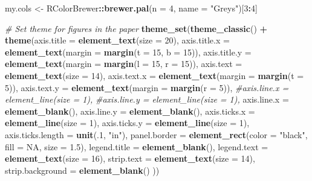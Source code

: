 \documentclass[]{article}
\newenvironment{Shaded}{\begin{snugshade}}{\end{snugshade}}
\newcommand{\KeywordTok}[1]{\textcolor[rgb]{0.13,0.29,0.53}{\textbf{#1}}}
\newcommand{\DataTypeTok}[1]{\textcolor[rgb]{0.13,0.29,0.53}{#1}}
\newcommand{\DecValTok}[1]{\textcolor[rgb]{0.00,0.00,0.81}{#1}}
\newcommand{\FloatTok}[1]{\textcolor[rgb]{0.00,0.00,0.81}{#1}}
\newcommand{\StringTok}[1]{\textcolor[rgb]{0.31,0.60,0.02}{#1}}
\newcommand{\CommentTok}[1]{\textcolor[rgb]{0.56,0.35,0.01}{\textit{#1}}}
\newcommand{\OtherTok}[1]{\textcolor[rgb]{0.56,0.35,0.01}{#1}}
\newcommand{\OperatorTok}[1]{\textcolor[rgb]{0.81,0.36,0.00}{\textbf{#1}}}
\newcommand{\NormalTok}[1]{#1}
\begin{document}
\begin{Shaded}
\begin{Highlighting}[]
\NormalTok{my.cols <-}\StringTok{ }\NormalTok{RColorBrewer}\OperatorTok{::}\KeywordTok{brewer.pal}\NormalTok{(}\DataTypeTok{n =} \DecValTok{4}\NormalTok{, }\DataTypeTok{name =} \StringTok{"Greys"}\NormalTok{)[}\DecValTok{3}\OperatorTok{:}\DecValTok{4}\NormalTok{]}

\CommentTok{# Set theme for figures in the paper}
\KeywordTok{theme_set}\NormalTok{(}\KeywordTok{theme_classic}\NormalTok{() }\OperatorTok{+}\StringTok{ }
\StringTok{  }\KeywordTok{theme}\NormalTok{(}\DataTypeTok{axis.title =} \KeywordTok{element_text}\NormalTok{(}\DataTypeTok{size =} \DecValTok{20}\NormalTok{),}
        \DataTypeTok{axis.title.x =} \KeywordTok{element_text}\NormalTok{(}\DataTypeTok{margin =} \KeywordTok{margin}\NormalTok{(}\DataTypeTok{t =} \DecValTok{15}\NormalTok{, }\DataTypeTok{b =} \DecValTok{15}\NormalTok{)),}
        \DataTypeTok{axis.title.y =} \KeywordTok{element_text}\NormalTok{(}\DataTypeTok{margin =} \KeywordTok{margin}\NormalTok{(}\DataTypeTok{l =} \DecValTok{15}\NormalTok{, }\DataTypeTok{r =} \DecValTok{15}\NormalTok{)),}
        \DataTypeTok{axis.text =} \KeywordTok{element_text}\NormalTok{(}\DataTypeTok{size =} \DecValTok{14}\NormalTok{),}
        \DataTypeTok{axis.text.x =} \KeywordTok{element_text}\NormalTok{(}\DataTypeTok{margin =} \KeywordTok{margin}\NormalTok{(}\DataTypeTok{t =} \DecValTok{5}\NormalTok{)),}
        \DataTypeTok{axis.text.y =} \KeywordTok{element_text}\NormalTok{(}\DataTypeTok{margin =} \KeywordTok{margin}\NormalTok{(}\DataTypeTok{r =} \DecValTok{5}\NormalTok{)),}
        \CommentTok{#axis.line.x = element_line(size = 1),}
        \CommentTok{#axis.line.y = element_line(size = 1),}
        \DataTypeTok{axis.line.x =} \KeywordTok{element_blank}\NormalTok{(),}
        \DataTypeTok{axis.line.y =} \KeywordTok{element_blank}\NormalTok{(),}
        \DataTypeTok{axis.ticks.x =} \KeywordTok{element_line}\NormalTok{(}\DataTypeTok{size =} \DecValTok{1}\NormalTok{),}
        \DataTypeTok{axis.ticks.y =} \KeywordTok{element_line}\NormalTok{(}\DataTypeTok{size =} \DecValTok{1}\NormalTok{),}
        \DataTypeTok{axis.ticks.length =} \KeywordTok{unit}\NormalTok{(.}\DecValTok{1}\NormalTok{, }\StringTok{"in"}\NormalTok{),}
        \DataTypeTok{panel.border =} \KeywordTok{element_rect}\NormalTok{(}\DataTypeTok{color =} \StringTok{"black"}\NormalTok{, }\DataTypeTok{fill =} \OtherTok{NA}\NormalTok{, }\DataTypeTok{size =} \FloatTok{1.5}\NormalTok{),}
        \DataTypeTok{legend.title =} \KeywordTok{element_blank}\NormalTok{(),}
        \DataTypeTok{legend.text =} \KeywordTok{element_text}\NormalTok{(}\DataTypeTok{size =} \DecValTok{16}\NormalTok{),}
        \DataTypeTok{strip.text =} \KeywordTok{element_text}\NormalTok{(}\DataTypeTok{size =} \DecValTok{14}\NormalTok{),}
        \DataTypeTok{strip.background =} \KeywordTok{element_blank}\NormalTok{()}
\NormalTok{        ))}
\end{Highlighting}
\end{Shaded}
\end{document}
